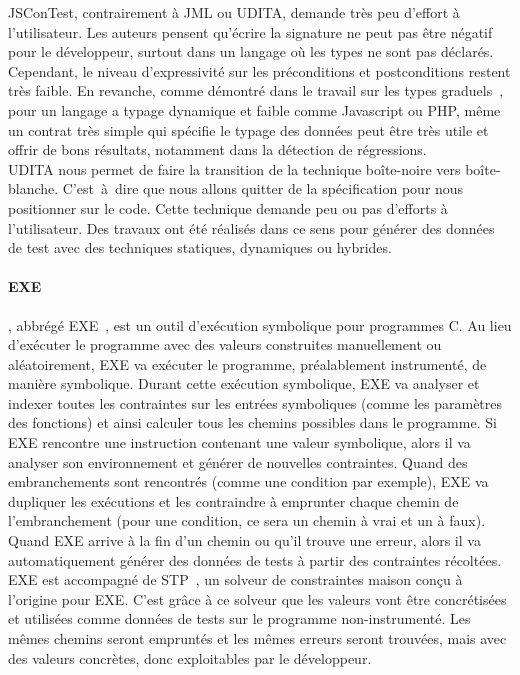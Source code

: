 JSConTest, contrairement à JML ou UDITA, demande très peu d'effort à
l'utilisateur. Les auteurs pensent qu'écrire la signature ne peut pas être
négatif pour le développeur, surtout dans un langage où les types ne sont pas
déclarés. Cependant, le niveau d'expressivité sur les préconditions et
postconditions restent très faible. En revanche, comme démontré dans le travail
sur les types graduels~, pour un langage a typage dynamique et
faible comme Javascript ou PHP, même un contrat très simple qui spécifie le
typage des données peut être très utile et offrir de bons résultats, notamment
dans la détection de régressions. \\

UDITA nous permet de faire la transition de la technique boîte-noire vers
boîte-blanche. C'est~à~dire que nous allons quitter de la spécification pour
nous positionner sur le code. Cette technique demande peu ou pas d'efforts à
l'utilisateur. Des travaux ont été réalisés dans ce sens pour générer des
données de test avec des techniques statiques, dynamiques ou hybrides.

\paragraph{EXE} , abbrégé
EXE~, est un outil d'exécution symbolique pour
programmes C.  Au lieu d'exécuter le programme avec des valeurs construites
manuellement ou aléatoirement, EXE va exécuter le programme, préalablement
instrumenté, de manière symbolique. Durant cette exécution symbolique, EXE va
analyser et indexer toutes les contraintes sur les entrées symboliques (comme
les paramètres des fonctions) et ainsi calculer tous les chemins possibles dans
le programme.  Si EXE rencontre une instruction contenant une valeur symbolique,
alors il va analyser son environnement et générer de nouvelles contraintes.
Quand des embranchements sont rencontrés (comme une condition par exemple), EXE
va dupliquer les exécutions et les contraindre à emprunter chaque chemin de
l'embranchement (pour une condition, ce sera un chemin à vrai et un à faux).
Quand EXE arrive à la fin d'un chemin ou qu'il trouve une erreur, alors il va
automatiquement générer des données de tests à partir des contraintes récoltées.
EXE est accompagné de STP~, un solveur de constraintes maison
conçu à l'origine pour EXE. C'est grâce à ce solveur que les valeurs vont être
concrétisées et utilisées comme données de tests sur le programme
non-instrumenté. Les mêmes chemins seront empruntés et les mêmes erreurs seront
trouvées, mais avec des valeurs concrètes, donc exploitables par le développeur.


